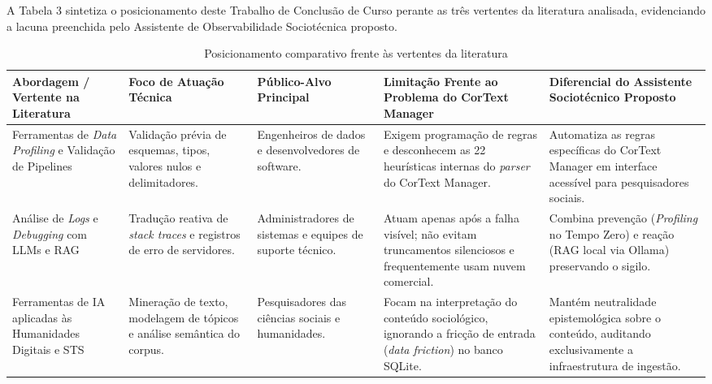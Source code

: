 \documentclass[
	oneside,
	a4paper,
	12pt,
	chapter=TITLE,
	section=TITLE,
	english,
	brazilian
]{abntex2}
\begin{document}
A Tabela 3 sintetiza o posicionamento deste Trabalho de Conclusão de Curso perante as três vertentes da literatura analisada, evidenciando a lacuna preenchida pelo Assistente de Observabilidade Sociotécnica proposto.

\begin{table}[htb]
  \caption{Posicionamento comparativo frente às vertentes da literatura}
  \label{tab:tabela_3}
  \centering
  \footnotesize
  \setlength{\tabcolsep}{3pt}
  \begin{tabularx}{\textwidth}{|>{\raggedright\arraybackslash}X|>{\raggedright\arraybackslash}X|>{\raggedright\arraybackslash}X|>{\raggedright\arraybackslash}X|>{\raggedright\arraybackslash}X|}
    \hline
    \textbf{Abordagem / Vertente na Literatura} & \textbf{Foco de Atuação Técnica} & \textbf{Público-Alvo Principal} & \textbf{Limitação Frente ao Problema do CorText Manager} & \textbf{Diferencial do Assistente Sociotécnico Proposto} \\ \hline
    Ferramentas de \textit{Data Profiling} e Validação de Pipelines \cite{Naumann2014,Abedjan2015} & Validação prévia de esquemas, tipos, valores nulos e delimitadores. & Engenheiros de dados e desenvolvedores de software. & Exigem programação de regras e desconhecem as 22 heurísticas internas do \textit{parser} do CorText Manager. & Automatiza as regras específicas do CorText Manager em interface acessível para pesquisadores sociais. \\ \hline
    Análise de \textit{Logs} e \textit{Debugging} com LLMs e RAG \cite{Lewis2020,Gao2023,Majors2022} & Tradução reativa de \textit{stack traces} e registros de erro de servidores. & Administradores de sistemas e equipes de suporte técnico. & Atuam apenas após a falha visível; não evitam truncamentos silenciosos e frequentemente usam nuvem comercial. & Combina prevenção (\textit{Profiling} no Tempo Zero) e reação (RAG local via Ollama) preservando o sigilo. \\ \hline
    Ferramentas de IA aplicadas às Humanidades Digitais e STS \cite{Abdo2021,DIgnazio2020} & Mineração de texto, modelagem de tópicos e análise semântica do corpus. & Pesquisadores das ciências sociais e humanidades. & Focam na interpretação do conteúdo sociológico, ignorando a fricção de entrada (\textit{data friction}) no banco SQLite. & Mantém neutralidade epistemológica sobre o conteúdo, auditando exclusivamente a infraestrutura de ingestão. \\ \hline
  \end{tabularx}
\end{table}
\FloatBarrier
\end{document}
